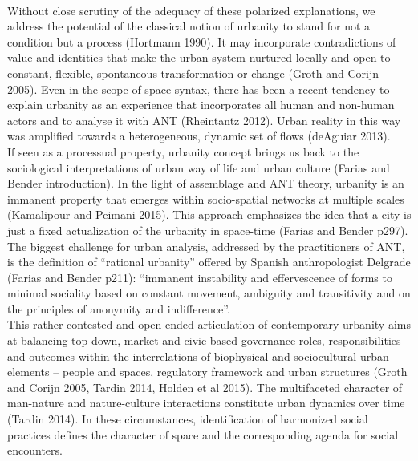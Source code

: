 \documentclass[11pt]{report}
\begin{document}
\\
Without close scrutiny of the adequacy of these polarized explanations, we address the potential of the classical notion of urbanity to stand for not a condition but a process (Hortmann 1990). It may incorporate contradictions of value and identities that make the urban system nurtured locally and open to constant, flexible, spontaneous transformation or change (Groth and Corijn 2005). Even in the scope of space syntax, there has been a recent tendency to explain urbanity as an experience that incorporates all human and non-human actors and to analyse it with ANT (Rheintantz 2012). Urban reality in this way was amplified towards a heterogeneous, dynamic set of flows (deAguiar 2013).
\\
If seen as a processual property, urbanity concept brings us back to the sociological interpretations of urban way of life and urban culture (Farias and Bender introduction). In the light of assemblage and ANT theory,  urbanity is an immanent property that emerges within socio-spatial networks at multiple scales (Kamalipour and Peimani 2015). This approach emphasizes the idea that a city is just a fixed actualization of the urbanity in space-time (Farias and Bender p297). The biggest challenge for urban analysis, addressed by the practitioners of ANT, is the definition of “rational urbanity” offered by Spanish anthropologist Delgrade (Farias and Bender p211): “immanent instability and effervescence of forms to minimal sociality based on constant movement, ambiguity and transitivity and on the principles of anonymity and indifference”.
\\
This rather contested and open-ended articulation of contemporary urbanity aims at balancing top-down, market and civic-based governance roles, responsibilities and outcomes within the interrelations of biophysical and sociocultural urban elements – people and spaces, regulatory framework and urban structures (Groth and Corijn 2005, Tardin 2014, Holden et al 2015). The multifaceted character of man-nature and nature-culture interactions constitute urban dynamics over time (Tardin 2014). In these circumstances, identification of harmonized social practices defines the character of space and the corresponding agenda for social encounters. 
\\
\end{document}
